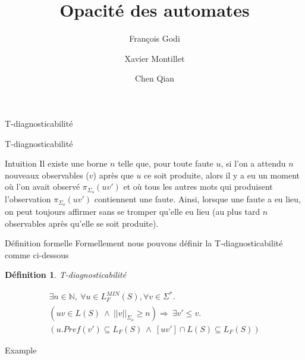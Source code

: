 \documentclass[11pt]{beamer}
\author{François Godi \and Xavier Montillet \and Chen Qian}
\title{Opacit\'e des automates}
\newtheorem{mydef}{D\'efinition}
\begin{document}
\begin{frame}
\titlepage
\end{frame}

\begin{frame}
\tableofcontents
\end{frame}

\begin{section}{T-diagnosticabilit\'e}

  \begin{frame}{T-diagnosticabilit\'e}
    \begin{block}{Intuition}
      Il existe une borne $n$ telle que, pour toute faute $u$, si l'on a attendu $n$ nouveaux observables ($v$) après que $u$ ce soit produite, alors il y a eu un moment où l'on avait observé $\pi_{\Sigma_o}(uv')$ et où tous les autres mots qui produisent l'observation $\pi_{\Sigma_o}(uv')$ contiennent une faute. Ainsi, lorsque une faute a eu lieu, on peut toujours affirmer sans se tromper qu'elle eu lieu (au plus tard $n$ observables après qu'elle se soit produite).
    \end{block}
  \end{frame}

  \begin{frame}{D\'efinition formelle}
    Formellement nous pouvons d\'efinir la T-diagnosticabilit\'e comme ci-dessous
    
    \begin{mydef}{T-diagnosticabilité}
      
      $$
      \begin{array}{l}
        \exists n \in \mathbb{N}, \ \forall u \in L^{MIN}_F(S), \forall v \in \Sigma^*.\\
        (uv \in L(S) \ \wedge \  ||v||_{\Sigma_o}\geq n) \Rightarrow \ \exists v' \leq v. \\
(u.Pref(v') \subseteq L_F(S) \ \wedge \  [uv'] \cap L(S) \subseteq L_F(S))
      \end{array}
      $$

    \end{mydef}
    
  \end{frame}

  \begin{frame}{Example}
    

\end{frame}
\end{section}
\end{document}
